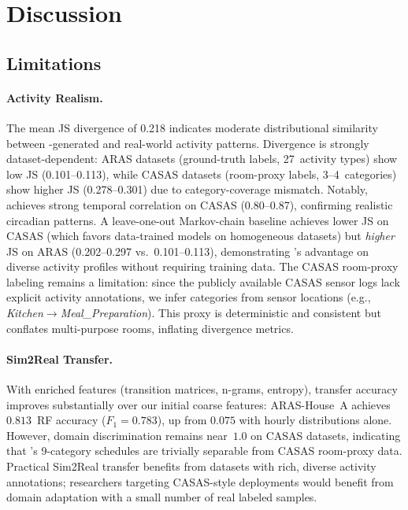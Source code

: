 \section{Discussion}\label{sec:discussion}

\subsection{Limitations}\label{sec:limitations}

\paragraph{Activity Realism.}
The mean JS divergence of 0.218 indicates moderate distributional
similarity between \sys{}-generated and real-world activity
patterns.  Divergence is strongly dataset-dependent: ARAS datasets
(ground-truth labels, 27~activity types) show low JS (0.101--0.113),
while CASAS datasets (room-proxy labels, 3--4~categories) show
higher JS (0.278--0.301) due to category-coverage mismatch.
Notably, \sys{} achieves strong temporal correlation on CASAS
(0.80--0.87), confirming realistic circadian patterns.
A leave-one-out Markov-chain baseline achieves lower JS on CASAS
(which favors data-trained models on homogeneous datasets) but
\emph{higher} JS on ARAS (0.202--0.297 vs.\ 0.101--0.113),
demonstrating \sys{}'s advantage on diverse activity profiles
without requiring training data.
The CASAS room-proxy labeling remains a limitation:
since the publicly available CASAS sensor logs
lack explicit activity annotations, we infer categories from sensor
locations (e.g., \emph{Kitchen}$\to$\emph{Meal\_Preparation}).
This proxy is deterministic and consistent but conflates
multi-purpose rooms, inflating divergence metrics.

\paragraph{Sim2Real Transfer.}
With enriched features (transition matrices, n-grams, entropy),
transfer accuracy improves substantially over our initial coarse
features: ARAS-House~A achieves $0.813$~RF accuracy
($F_1 = 0.783$), up from $0.075$ with hourly distributions alone.
However, domain discrimination remains near~$1.0$ on CASAS datasets,
indicating that \sys{}'s 9-category schedules are trivially separable
from CASAS room-proxy data.  Practical Sim2Real transfer benefits
from datasets with rich, diverse activity annotations;
researchers targeting CASAS-style deployments would benefit from
domain adaptation with a small number of real labeled samples.

